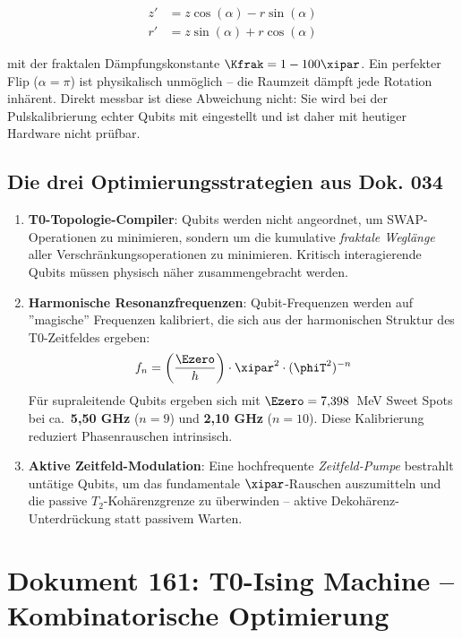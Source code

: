 \begin{align}
    z' &= z \cos(\alpha) - r \sin(\alpha) \\
    r' &= z \sin(\alpha) + r \cos(\alpha)
\end{align}

mit der fraktalen Dämpfungskonstante $\Kfrak = 1 - 100\xipar$.
Ein perfekter Flip ($\alpha = \pi$) ist physikalisch unmöglich -- die Raumzeit
dämpft jede Rotation inhärent. Direkt messbar ist diese Abweichung nicht: Sie wird bei der Pulskalibrierung echter Qubits mit eingestellt und ist daher mit heutiger Hardware nicht prüfbar.

\subsection{Die drei Optimierungsstrategien aus Dok. 034}

\begin{enumerate}
    \item \textbf{T0-Topologie-Compiler}: Qubits werden nicht angeordnet, um SWAP-Operationen
    zu minimieren, sondern um die kumulative \emph{fraktale Weglänge} aller
    Verschränkungsoperationen zu minimieren. Kritisch interagierende Qubits müssen
    physisch näher zusammengebracht werden.

    \item \textbf{Harmonische Resonanzfrequenzen}: Qubit-Frequenzen werden auf
    ''magische'' Frequenzen kalibriert, die sich aus der harmonischen Struktur
    des T0-Zeitfeldes ergeben:
    \begin{equation}
        f_n = \left(\frac{\Ezero}{h}\right) \cdot \xipar^2 \cdot (\phiT^2)^{-n}
        \label{eq:harmonic_freq}
    \end{equation}
    Für supraleitende Qubits ergeben sich mit $\Ezero = 7{,}398$~MeV Sweet Spots bei ca.\ \textbf{5,50 GHz}
    ($n=9$) und \textbf{2,10 GHz} ($n=10$). Diese Kalibrierung reduziert
    Phasenrauschen intrinsisch.

    \item \textbf{Aktive Zeitfeld-Modulation}: Eine hochfrequente
    \emph{Zeitfeld-Pumpe} bestrahlt untätige Qubits, um das fundamentale
    $\xipar$-Rauschen auszumitteln und die passive $T_2$-Kohärenzgrenze zu
    überwinden -- aktive Dekohärenz-Unterdrückung statt passivem Warten.
\end{enumerate}

\clearpage

\section{Dokument 161: T0-Ising Machine -- Kombinatorische Optimierung}
\label{sec:doc161}

